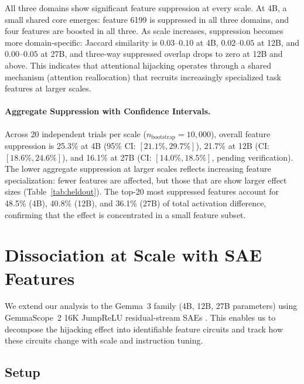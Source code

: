 \documentclass[10pt,twocolumn]{article}
\newcommand{\gemma}{Gemma~3\xspace}
\newcommand{\gemmascope}{GemmaScope~2\xspace}
\begin{document}
All three domains show significant feature suppression at every scale.
At 4B, a small shared core emerges: feature 6199 is suppressed in all three domains, and four features are boosted in all three.
As scale increases, suppression becomes more domain-specific: Jaccard similarity is $0.03$--$0.10$ at 4B, $0.02$--$0.05$ at 12B, and $0.00$--$0.05$ at 27B, and three-way suppressed overlap drops to zero at 12B and above.
This indicates that attentional hijacking operates through a shared mechanism (attention reallocation) that recruits increasingly specialized task features at larger scales.

\paragraph{Aggregate Suppression with Confidence Intervals.}
Across 20 independent trials per scale ($n_{\text{bootstrap}} = 10{,}000$), overall feature suppression is 25.3\% at 4B (95\% CI: $[21.1\%, 29.7\%]$), 21.7\% at 12B (CI: $[18.6\%, 24.6\%]$), and 16.1\% at 27B (CI: $[14.0\%, 18.5\%]$, pending verification).
The lower aggregate suppression at larger scales reflects increasing feature specialization: fewer features are affected, but those that are show larger effect sizes (Table~\ref{tab:heldout}).
The top-20 most suppressed features account for 48.5\% (4B), 40.8\% (12B), and 36.1\% (27B) of total activation difference, confirming that the effect is concentrated in a small feature subset.

\section{Dissociation at Scale with SAE Features}
\label{sec:scaling}

We extend our analysis to the \gemma family (4B, 12B, 27B parameters) using \gemmascope 16K JumpReLU residual-stream SAEs \citep{lieberum2024gemma}.
This enables us to decompose the hijacking effect into identifiable feature circuits and track how these circuits change with scale and instruction tuning.

\subsection{Setup}
\end{document}
